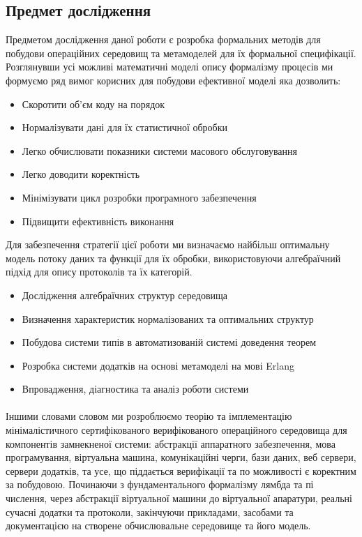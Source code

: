 \documentclass[11pt,oneside]{article}
\begin{document}
\newpage
\subsection{Предмет дослідження}
\vspace{0.5cm}

   Предметом дослідження даної роботи є розробка формальних методів для побудови
   операційних середовищ та метамоделей для їх формальної специфікації. Розглянувши усі
   можливі математичні моделі опису формалізму процесів ми формуємо ряд вимог корисних
   для побудови ефективної моделі яка дозволить:

\begin{itemize}
   \item Скоротити об’єм коду на порядок
   \item Нормалізувати дані для їх статистичної обробки
   \item Легко обчислювати показники системи масового обслуговування
   \item Легко доводити коректність
   \item Мінімізувати цикл розробки програмного забезпечення
   \item Підвищити ефективність виконання
\end{itemize}

  Для забезпечення стратегії цієї роботи ми визначаємо найбільш оптимальну модель
  потоку даних та функції для їх обробки, використовуючи алгебраїчний підхід
  для опису протоколів та їх категорій.

\begin{itemize}
   \item Дослідження алгебраїчних структур середовища
   \item Визначення характеристик нормалізованих та оптимальних структур
   \item Побудова системи типів в автоматизованій системі доведення теорем
   \item Розробка системи додатків на основі метамоделі на мові Erlang
   \item Впровадження, діагностика та аналіз роботи системи
\end{itemize}

   \paragraph{}
   Іншими словами словом ми розроблюємо теорію та імплементацію мінімалістичного
   сертифікованого верифікованого операційного середовища для компонентів замнекненої системи:
   абстракції аппаратного забезпечення, мова програмування, віртуальна машина, комунікаційні
   черги, бази даних, веб сервери, сервери додатків, та усе, що піддається верифікації та по
   можливості є коректним за побудовою. Починаючи з фундаментального формалізму лямбда та пі числення,
   через абстракції віртуальної машини до віртуальної апаратури, реальні сучасні додатки та протоколи,
   закінчуючи прикладами, засобами та документацією на створене обчислювальне середовище та його модель.\\
\end{document}
